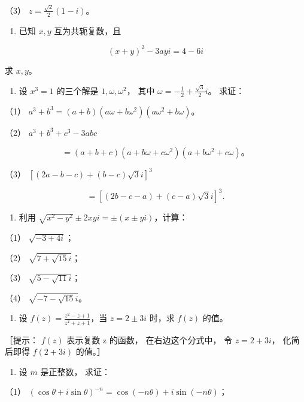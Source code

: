 （3） \(z = \frac{\sqrt{2}}{2} (1 - i)\)。

\begin{enumerate}[start=6]
\item
  已知 \(x, y\) 互为共轭复数，且
\end{enumerate}

\[
(x + y) ^ {2} - 3 a y i = 4 - 6 i
\]

求 \(x, y\)。

\begin{enumerate}[start=7]
\item
  设 \(x^{3} = 1\) 的三个解是 \(1, \omega, \omega^{2}\)， 其中
  \(\omega = -\frac{1}{2} + \frac{\sqrt{3}}{2} i\)。 求证：
\end{enumerate}

（1）
\(a^3 + b^3 = (a + b)(a\omega + b\omega^2)(a\omega^2 + b\omega)\)。

（2） \(a^3 + b^3 + c^3 - 3abc\)

\[
= (a + b + c) (a + b \omega + c \omega^ {2}) (a + b \omega^ {2} + c \omega)\text{。}
\]

（3） \(\left[(2a - b - c) + (b - c)\sqrt{3}i\right]^3\)

\[
= [ (2 b - c - a) + (c - a) \sqrt {3} i ] ^ {3}.
\]

\begin{enumerate}[start=8]
\item
  利用 \(\sqrt{x^2 - y^2} \pm 2xyi = \pm (x \pm yi)\)，计算：
\end{enumerate}

（1） \(\sqrt{-3 + 4i}\)；

（2） \(\sqrt{7 + \sqrt{15}i}\)；

（3） \(\sqrt{5 - \sqrt{11}i}\)；

（4） \(\sqrt{-7 - \sqrt{15}i}\)。

\begin{enumerate}[start=9]
\item
  设 \(f(z) = \frac{z^2 - z + 1}{z^2 + z + 1}\)，当 \(z = 2 \pm 3i\)
  时，求 \(f(z)\) 的值。
\end{enumerate}

［提示： \(f(z)\) 表示复数 z 的函数， 在右边这个分式中， 令 \(z=2+3i\)，
化简后即得 \(f(2+3i)\) 的值。］

\begin{enumerate}[start=10]
\item
  设 \(m\) 是正整数， 求证：
\end{enumerate}

（1）
\((\cos \theta + i \sin \theta)^{-n} = \cos (-n\theta) + i \sin (-n\theta)\)；


